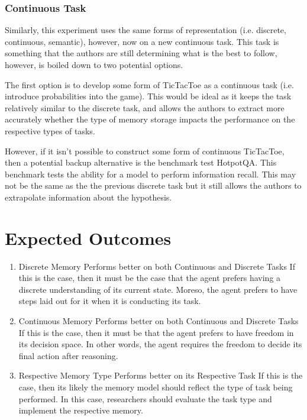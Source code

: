 \documentclass[11pt]{article}
\begin{document}
\subsubsection{Continuous Task}
Similarly, this experiment uses the same forms of representation (i.e. discrete, continuous, semantic), however, now on a new continuous task. This task is something that the authors are still determining what is the best to follow, however, is boiled down to two potential options.

The first option is to develop some form of TicTacToe as a continuous task (i.e. introduce probabilities into the game). This would be ideal as it keeps the task relatively similar to the discrete task, and allows the authors to extract more accurately whether the type of memory storage impacts the performance on the respective types of tasks.

However, if it isn't possible to construct some form of continuous TicTacToe, then a potential backup alternative is the benchmark test HotpotQA. This benchmark tests the ability for a model to perform information recall. This may not be the same as the the previous discrete task but it still allows the authors to extrapolate information about the hypothesis.

\section{Expected Outcomes}
\begin{enumerate}
    \item Discrete Memory Performs better on both Continuous and Discrete Tasks
    \subitem If this is the case, then it must be the case that the agent prefers having a discrete understanding of its current state. Moreso, the agent prefers to have steps laid out for it when it is conducting its task.
    \item Continuous Memory Performs better on both Continuous and Discrete Tasks
    \subitem If this is the case, then it must be that the agent prefers to have freedom in its decision space. In other words, the agent requires the freedom to decide its final action after reasoning.
    \item Respective Memory Type Performs better on its Respective Task
    \subitem If this is the case, then its likely the memory model should reflect the type of task being performed. In this case, researchers should evaluate the task type and implement the respective memory.
\end{enumerate}
\end{document}
